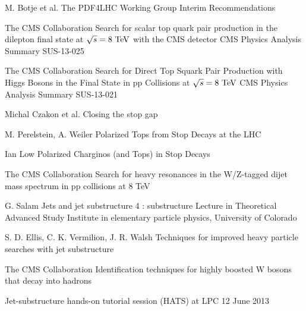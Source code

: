 \begin{thebibliography}{2}
             {M. Botje et al.}
             {The PDF4LHC Working Group Interim Recommendations}
             {}


             {The CMS Collaboration}
             {Search for scalar top quark pair production in the dilepton
             final state at $\sqrt{s} = 8~\text{TeV}$ with the CMS detector}
             {CMS Physics Analysis Summary SUS-13-025}

             {The CMS Collaboration}
             {Search for Direct Top Squark Pair Production with Higgs Bosons in the Final
             State in pp Collisions at $\sqrt{s} = 8~\text{TeV}$}
             {CMS Physics Analysis Summary SUS-13-021}

             {Michal Czakon et al.}
             {Closing the stop gap}
             {}

             {M. Perelstein, A. Weiler}
             {Polarized Tops from Stop Decays at the LHC}
             {}

             {Ian Low}
             {Polarized Charginos (and Tops) in Stop Decays}
             {}


             {The CMS Collaboration}
             {Search for heavy resonances in the W/Z-tagged dijet mass
             spectrum in pp collisions at 8 TeV}
             {}

             {G. Salam}
             {Jets and jet substructure 4 : substructure}
             {Lecture in Theoretical Advanced Study Institute in elementary particle physics,
             University of Colorado}

             {S. D. Ellis, C. K. Vermilion, J. R. Walsh}
             {Techniques for improved heavy particle searches with jet substructure}
             {}

             {The CMS Collaboration}
             {Identification techniques for highly boosted W bosons that decay into hadrons}
             {}

             {}
             {Jet-substructure hands-on tutorial session (HATS) at LPC}
             {12 June 2013}


\end{thebibliography}
